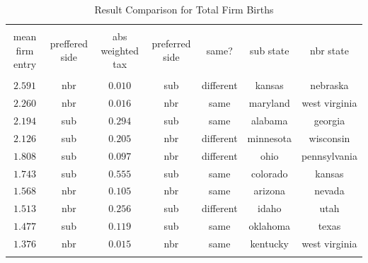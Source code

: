 \documentclass[12pt,a4paper]{article}
\begin{document}



\begin{table}[!htbp] \centering 
  \caption{Result Comparison for Total Firm Births} 
  \label{meantable} 
\tiny 
\begin{tabular}{@{\extracolsep{5pt}} ccccccc} 
\\[-1.8ex]\hline 
\hline \\[-1.8ex] 
mean firm entry & preffered side & abs weighted tax & preferred side & same? & sub state & nbr state \\ 
\hline \\[-1.8ex] 
$2.591$ & nbr & $0.010$ & sub & different & kansas & nebraska \\ 
$2.260$ & nbr & $0.016$ & nbr & same & maryland & west virginia \\ 
$2.194$ & sub & $0.294$ & sub & same & alabama & georgia \\ 
$2.126$ & sub & $0.205$ & nbr & different & minnesota & wisconsin \\ 
$1.808$ & sub & $0.097$ & nbr & different & ohio & pennsylvania \\ 
$1.743$ & sub & $0.555$ & sub & same & colorado & kansas \\ 
$1.568$ & nbr & $0.105$ & nbr & same & arizona & nevada \\ 
$1.513$ & nbr & $0.256$ & sub & different & idaho & utah \\ 
$1.477$ & sub & $0.119$ & sub & same & oklahoma & texas \\ 
$1.376$ & nbr & $0.015$ & nbr & same & kentucky & west virginia \\ 
\hline \\[-1.8ex] 
\end{tabular} 
\end{table} 
\end{document}
